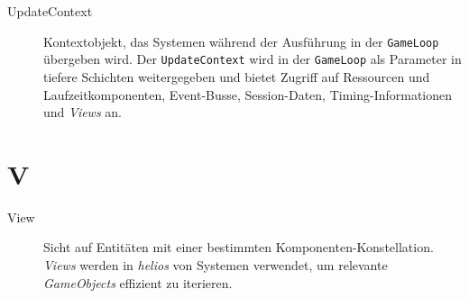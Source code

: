 \begin{description}
    \item[UpdateContext] Kontextobjekt, das Systemen während der Ausführung in der \texttt{GameLoop} übergeben wird.
    Der \texttt{UpdateContext} wird in der \texttt{GameLoop} als Parameter in tiefere Schichten weitergegeben und bietet Zugriff auf Ressourcen und Laufzeitkomponenten, Event-Busse, Session-Daten, Timing-Informationen und \textit{Views} an.
\end{description}

\section*{V}

\begin{description}
    \item[View] Sicht auf Entitäten mit einer bestimmten Komponenten-Konstellation.
    \textit{Views} werden in \textit{helios} von Systemen verwendet, um relevante \textit{GameObjects} effizient zu iterieren.
\end{description}